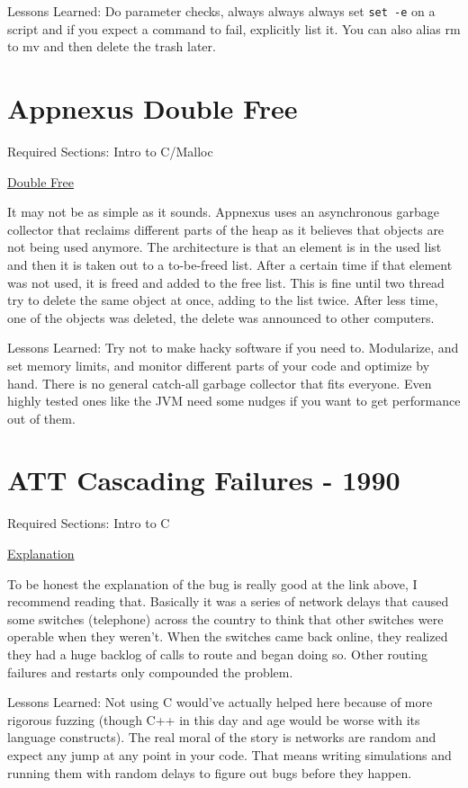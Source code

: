 Lessons Learned: Do parameter checks, always always always set \texttt{set -e} on a script and if you expect a command to fail, explicitly list it. You can also alias rm to mv and then delete the trash later.

\section{Appnexus Double Free}

Required Sections: Intro to C/Malloc

\href{https://techblog.appnexus.com/2013-09-17-outage-postmortem-586b19ae4307}{Double Free}

It may not be as simple as it sounds. Appnexus uses an asynchronous garbage collector that reclaims different parts of the heap as it believes that objects are not being used anymore. The architecture is that an element is in the used list and then it is taken out to a to-be-freed list. After a certain time if that element was not used, it is freed and added to the free list. This is fine until two thread try to delete the same object at once, adding to the list twice. After less time, one of the objects was deleted, the delete was announced to other computers.

Lessons Learned: Try not to make hacky software if you need to. Modularize, and set memory limits, and monitor different parts of your code and optimize by hand. There is no general catch-all garbage collector that fits everyone. Even highly tested ones like the JVM need some nudges if you want to get performance out of them.

\section{ATT Cascading Failures - 1990}

Required Sections: Intro to C

\href{http://users.csc.calpoly.edu/~jdalbey/SWE/Papers/att_collapse.html}{Explanation}

To be honest the explanation of the bug is really good at the link above, I recommend reading that. Basically it was a series of network delays that caused some switches (telephone) across the country to think that other switches were operable when they weren't. When the switches came back online, they realized they had a huge backlog of calls to route and began doing so. Other routing failures and restarts only compounded the problem.

Lessons Learned: Not using C would've actually helped here because of more rigorous fuzzing (though C++ in this day and age would be worse with its language constructs). The real moral of the story is networks are random and expect any jump at any point in your code. That means writing simulations and running them with random delays to figure out bugs before they happen.
